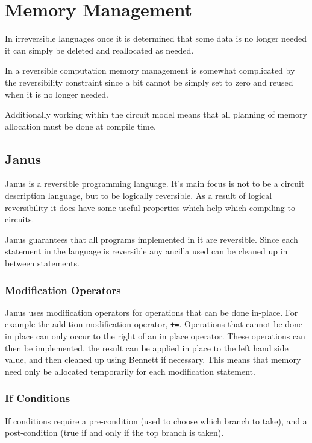 \chapter{Memory Management}

In irreversible languages once it is determined that some data is no longer
needed it can simply be deleted and reallocated as needed.

In a reversible computation memory management is somewhat complicated by the
reversibility constraint since a bit cannot be simply set to zero and reused
when it is no longer needed.

Additionally working within the circuit model means that all planning of memory
allocation must be done at compile time.


\section{Janus}

Janus\cite{YG:2007,LD:1982} is a reversible programming
language.  It's main focus is not to be a circuit description language, but to
be logically reversible. As a result of logical reversibility it does have some
useful properties which help which compiling to circuits.

Janus guarantees that all programs implemented in it are reversible. Since each
statement in the language is reversible any ancilla used can be cleaned up in
between statements.

\subsection{Modification Operators}

Janus uses modification operators for operations that can be done in-place. For
example the addition modification operator, \verb|+=|. Operations that cannot be
done in place can only occur to the right of an in place operator. These
operations can then be implemented, the result can be applied in place to the
left hand side value, and then cleaned up using Bennett if necessary. This means
that memory need only be allocated temporarily for each modification statement.

\subsection{If Conditions}
If conditions require a pre-condition (used to choose which branch to take),
and a post-condition (true if and only if the top branch is taken).

